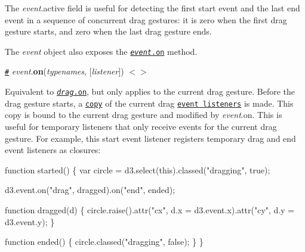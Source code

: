 The {\itshape event}.active field is useful for detecting the first start event and the last end event in a sequence of concurrent drag gestures\+: it is zero when the first drag gesture starts, and zero when the last drag gesture ends.

The {\itshape event} object also exposes the \href{#event_on}{\tt {\itshape event}.on} method.

\href{#event_on}{\tt \#} {\itshape event}.{\bfseries on}({\itshape typenames}, \mbox{[}{\itshape listener}\mbox{]}) \href{https://github.com/d3/d3-drag/blob/master/src/event.js}{\tt $<$$>$}

Equivalent to \href{#drag_on}{\tt {\itshape drag}.on}, but only applies to the current drag gesture. Before the drag gesture starts, a \href{https://github.com/d3/d3-dispatch#dispatch_copy}{\tt copy} of the current drag \href{#drag_on}{\tt event listeners} is made. This copy is bound to the current drag gesture and modified by {\itshape event}.on. This is useful for temporary listeners that only receive events for the current drag gesture. For example, this start event listener registers temporary drag and end event listeners as closures\+:


\begin{DoxyCode}
function started() \{
  var circle = d3.select(this).classed("dragging", true);

  d3.event.on("drag", dragged).on("end", ended);

  function dragged(d) \{
    circle.raise().attr("cx", d.x = d3.event.x).attr("cy", d.y = d3.event.y);
  \}

  function ended() \{
    circle.classed("dragging", false);
  \}
\}
\end{DoxyCode}
 